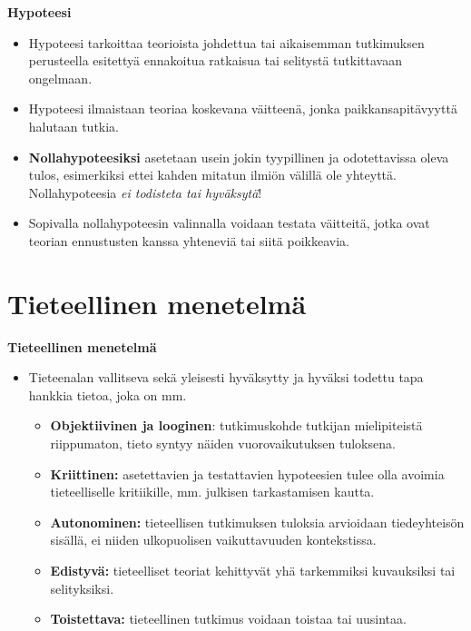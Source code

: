 \documentclass[
]{report}
\begin{document}
\begin{defblock}{}

\textbf{Hypoteesi}

\begin{itemize}
\item
  Hypoteesi tarkoittaa teorioista johdettua tai aikaisemman tutkimuksen
  perusteella esitettyä ennakoitua ratkaisua tai selitystä tutkittavaan
  ongelmaan.
\item
  Hypoteesi ilmaistaan teoriaa koskevana väitteenä, jonka
  paikkansapitävyyttä halutaan tutkia.
\item
  \textbf{Nollahypoteesiksi} asetetaan usein jokin tyypillinen ja
  odotettavissa oleva tulos, esimerkiksi ettei kahden mitatun ilmiön
  välillä ole yhteyttä. Nollahypoteesia \emph{ei todisteta tai
  hyväksytä}!
\item
  Sopivalla nollahypoteesin valinnalla voidaan testata väitteitä, jotka
  ovat teorian ennustusten kanssa yhteneviä tai siitä poikkeavia.
\end{itemize}

\end{defblock}

\hypertarget{tieteellinen-menetelmuxe4}{%
\section{Tieteellinen menetelmä}\label{tieteellinen-menetelmuxe4}}

\begin{defblock}{}

\textbf{Tieteellinen menetelmä}

\begin{itemize}
\item
  Tieteenalan vallitseva sekä yleisesti hyväksytty ja hyväksi todettu
  tapa hankkia tietoa, joka on mm.

  \begin{itemize}
  \item
    \textbf{Objektiivinen ja looginen}: tutkimuskohde tutkijan
    mielipiteistä riippumaton, tieto syntyy näiden vuorovaikutuksen
    tuloksena.
  \item
    \textbf{Kriittinen:} asetettavien ja testattavien hypoteesien tulee
    olla avoimia tieteelliselle kritiikille, mm. julkisen tarkastamisen
    kautta.
  \item
    \textbf{Autonominen:} tieteellisen tutkimuksen tuloksia arvioidaan
    tiedeyhteisön sisällä, ei niiden ulkopuolisen vaikuttavuuden
    kontekstissa.
  \item
    \textbf{Edistyvä:} tieteelliset teoriat kehittyvät yhä tarkemmiksi
    kuvauksiksi tai selityksiksi.
  \item
    \textbf{Toistettava:} tieteellinen tutkimus voidaan toistaa tai
    uusintaa.
  \end{itemize}
\end{itemize}

\end{defblock}
\end{document}
